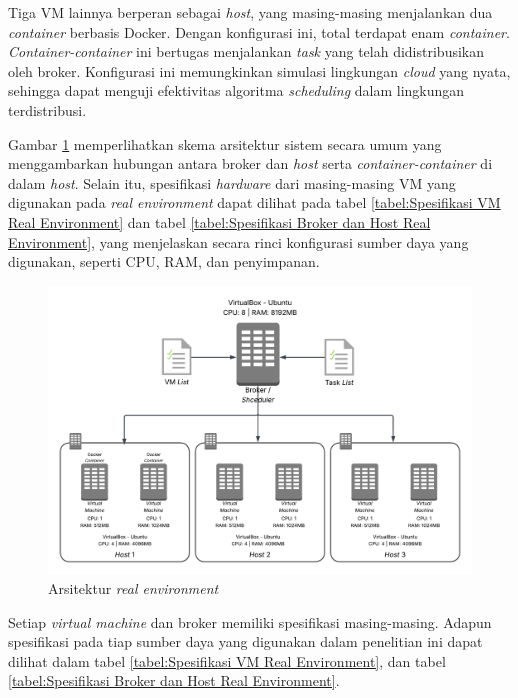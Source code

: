 Tiga VM lainnya berperan sebagai \textit{host}, yang masing-masing menjalankan dua \textit{container} berbasis Docker. Dengan konfigurasi ini, total terdapat enam \textit{container}. \textit{Container-container} ini bertugas menjalankan \textit{task} yang telah didistribusikan oleh broker. Konfigurasi ini memungkinkan simulasi lingkungan \textit{cloud} yang nyata, sehingga dapat menguji efektivitas algoritma \textit{scheduling} dalam lingkungan terdistribusi.

Gambar \ref{figure:Arsitektur Implementasi Real} memperlihatkan skema arsitektur sistem secara umum yang menggambarkan hubungan antara broker dan \textit{host} serta \textit{container-container} di dalam \textit{host}. Selain itu, spesifikasi \textit{hardware} dari masing-masing VM yang digunakan pada \textit{real environment} dapat dilihat pada tabel \ref{tabel:Spesifikasi VM Real Environment} dan tabel \ref{tabel:Spesifikasi Broker dan Host Real Environment}, yang menjelaskan secara rinci konfigurasi sumber daya yang digunakan, seperti CPU, RAM, dan penyimpanan.

\newpage

\begin{figure} [H]
  \includegraphics[width=1.1\linewidth]{gambar/Arsitektur Implementasi CloudSim.png}
  \caption{Arsitektur \textit{real environment}}
  \label{figure:Arsitektur Implementasi Real}
\end{figure}

Setiap \textit{virtual machine} dan broker memiliki spesifikasi masing-masing. Adapun spesifikasi pada tiap sumber daya yang digunakan dalam penelitian ini dapat dilihat dalam tabel \ref{tabel:Spesifikasi VM Real Environment}, dan tabel \ref{tabel:Spesifikasi Broker dan Host Real Environment}.

